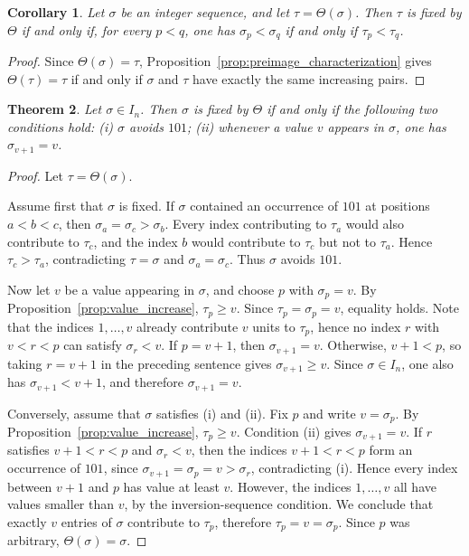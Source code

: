 \documentclass[11pt]{article}
\newtheorem{thm}{Theorem}[section]
\newtheorem{corol}[thm]{Corollary}
\theoremstyle{remark}
\theoremstyle{definition}
\begin{document}
\begin{corol}\label{corol:fixed_preimage}
Let $\sigma$ be an integer sequence, and let $\tau=\Theta(\sigma)$. Then $\tau$ is fixed by $\Theta$ if and only if, for every $p<q$, one has $\sigma_p<\sigma_q$ if and only if $\tau_p<\tau_q$.
\end{corol}

\begin{proof}
Since $\Theta(\sigma)=\tau$, Proposition~\ref{prop:preimage_characterization} gives $\Theta(\tau)=\tau$ if and only if $\sigma$ and $\tau$ have exactly the same increasing pairs.
\end{proof}

\begin{thm}\label{thm:fixed_point_characterization}
Let $\sigma\in I_n$. Then $\sigma$ is fixed by $\Theta$ if and only if the following two conditions hold: \textup{(i)} $\sigma$ avoids $101$; \textup{(ii)} whenever a value $v$ appears in $\sigma$, one has $\sigma_{v+1}=v$.
\end{thm}

\begin{proof}
Let $\tau=\Theta(\sigma)$.

Assume first that $\sigma$ is fixed. If $\sigma$ contained an occurrence of $101$ at positions $a<b<c$, then $\sigma_a=\sigma_c>\sigma_b$. Every index contributing to $\tau_a$ would also contribute to $\tau_c$, and the index $b$ would contribute to $\tau_c$ but not to $\tau_a$. Hence $\tau_c>\tau_a$, contradicting $\tau=\sigma$ and $\sigma_a=\sigma_c$. Thus $\sigma$ avoids $101$.

Now let $v$ be a value appearing in $\sigma$, and choose $p$ with $\sigma_p=v$. By Proposition~\ref{prop:value_increase}, $\tau_p\geq v$. Since $\tau_p=\sigma_p=v$, equality holds. Note that the indices $1,\ldots,v$ already contribute $v$ units to $\tau_p$, hence no index $r$ with $v<r<p$ can satisfy $\sigma_r<v$. If $p=v+1$, then $\sigma_{v+1}=v$. Otherwise, $v+1<p$, so taking $r=v+1$ in the preceding sentence gives $\sigma_{v+1}\geq v$. Since $\sigma\in I_n$, one also has $\sigma_{v+1}<v+1$, and therefore $\sigma_{v+1}=v$.

Conversely, assume that $\sigma$ satisfies \textup{(i)} and \textup{(ii)}. Fix $p$ and write $v=\sigma_p$. By Proposition~\ref{prop:value_increase}, $\tau_p\geq v$. Condition \textup{(ii)} gives $\sigma_{v+1}=v$. If $r$ satisfies $v+1<r<p$ and $\sigma_r<v$, then the indices $v+1<r<p$ form an occurrence of $101$, since $\sigma_{v+1}=\sigma_p=v>\sigma_r$, contradicting \textup{(i)}. Hence every index between $v+1$ and $p$ has value at least $v$. However, the indices $1,\ldots,v$ all have values smaller than $v$, by the inversion-sequence condition. We conclude that exactly $v$ entries of $\sigma$ contribute to $\tau_p$, therefore $\tau_p=v=\sigma_p$. Since $p$ was arbitrary, $\Theta(\sigma)=\sigma$.
\end{proof}
\end{document}
